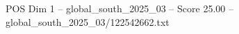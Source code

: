\begin{textsample}{POS Dim 1 – global\_south\_2025\_03 – Score 25.00 – global\_south\_2025\_03/122542662.txt}
\end{textsample}
